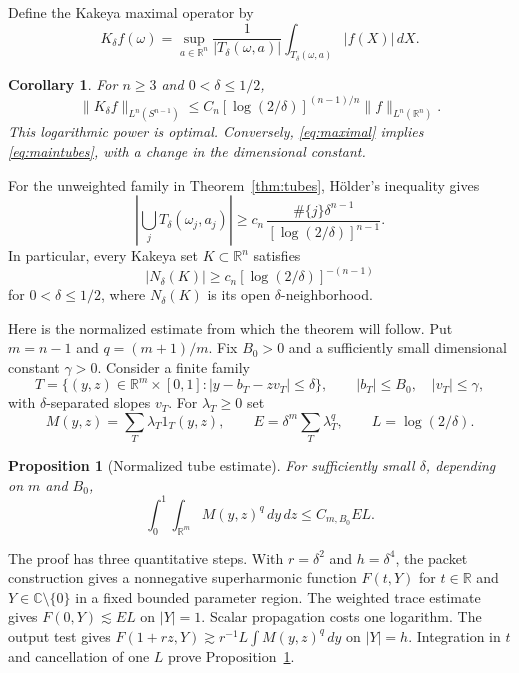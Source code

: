 \documentclass[11pt]{article}
\newtheorem{proposition}{Proposition}
\newtheorem{corollary}{Corollary}
\numberwithin{equation}{section}
\newcommand{\R}{\mathbb R}
\newcommand{\C}{\mathbb C}
\newcommand{\dd}{\,d}
\begin{document}
Define the Kakeya maximal operator by
\[
 K_\delta f(\omega)=\sup_{a\in\R^n}
 \frac{1}{|T_\delta(\omega,a)|}
                   \int_{T_\delta(\omega,a)}|f(X)|\dd X.
\]

\begin{corollary}\label{cor:maximal}
For $n\ge3$ and $0<\delta\le1/2$,
\begin{equation}\label{eq:maximal}
 \|K_\delta f\|_{L^n(S^{n-1})}
 \le C_n[\log(2/\delta)]^{(n-1)/n}\|f\|_{L^n(\R^n)}.
\end{equation}
This logarithmic power is optimal. Conversely,
\eqref{eq:maximal} implies \eqref{eq:maintubes}, with a change in
the dimensional constant.
\end{corollary}

For the unweighted family in Theorem~\ref{thm:tubes}, H\"older's
inequality gives
\[
 \left|\bigcup_jT_\delta(\omega_j,a_j)\right|
 \ge c_n\,\frac{\#\{j\}\delta^{n-1}}
                  {[\log(2/\delta)]^{n-1}}.
\]
In particular, every Kakeya set $K\subset\R^n$ satisfies
\begin{equation}\label{eq:neighborhood}
 |N_\delta(K)|\ge c_n[\log(2/\delta)]^{-(n-1)}
\end{equation}
for $0<\delta\le1/2$, where $N_\delta(K)$ is its open
$\delta$-neighborhood.

Here is the normalized estimate from which the theorem will follow.
Put $m=n-1$ and $q=(m+1)/m$. Fix $B_0>0$ and a sufficiently small
dimensional constant $\gamma>0$. Consider a finite family
\[
 T=\{(y,z)\in\R^m\times[0,1]:|y-b_T-zv_T|\le\delta\},
 \qquad |b_T|\le B_0,\quad |v_T|\le\gamma,
\]
with $\delta$-separated slopes $v_T$.
For $\lambda_T\ge0$ set
\[
 M(y,z)=\sum_T\lambda_T1_T(y,z),\qquad
 E=\delta^m\sum_T\lambda_T^q,\qquad L=\log(2/\delta).
\]

\begin{proposition}[Normalized tube estimate]\label{thm:main}
For sufficiently small $\delta$, depending on $m$ and $B_0$,
\begin{equation}\label{eq:overlap}
 \int_0^1\int_{\R^m}M(y,z)^q\dd y\dd z\le C_{m,B_0}EL.
\end{equation}
\end{proposition}

The proof has three quantitative steps. With $r=\delta^2$ and
$h=\delta^4$, the packet construction gives a nonnegative
superharmonic function $F(t,Y)$ for $t\in\R$ and
$Y\in\C\setminus\{0\}$ in a fixed bounded parameter region.
The weighted trace estimate gives $F(0,Y)\lesssim EL$ on $|Y|=1$.
Scalar propagation costs one logarithm. The output test gives
$F(1+rz,Y)\gtrsim r^{-1}L\int M(y,z)^q\dd y$ on $|Y|=h$.
Integration in $t$ and cancellation of one $L$ prove
Proposition~\ref{thm:main}.
\end{document}
